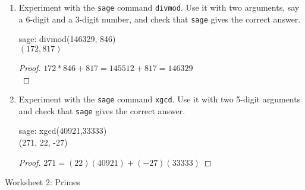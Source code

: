 \documentclass[11pt]{article}
\def\sage{{\tt sage} }
\newcommand\setItemnumber[1]{\setcounter{enumi}{\numexpr#1-1\relax}}
\begin{document}
\begin{enumerate}
  \setItemnumber{9}
  \item Experiment with the \sage command {\tt divmod}.
  Use it with two arguments, say a 6-digit and a 3-digit number, and check that \sage gives the correct answer.

  sage: divmod(146329, 846)\\
  $\left(172, 817\right)$
  \begin{proof}
$172*846+817=145512+817=146329$\\
  \end{proof}

  \setItemnumber{10}
  \item Experiment with the \sage command {\tt xgcd}.
  Use it with two 5-digit arguments and check that \sage gives the correct answer.

  sage: xgcd(40921,33333)\\
  (271, 22, -27)
  \begin{proof}
$
271=(22)(40921)+(-27)(33333)$
  \end{proof}


\end{enumerate}
\begin{center}
  \Large{Worksheet 2: Primes}
\end{center}
\end{document}
